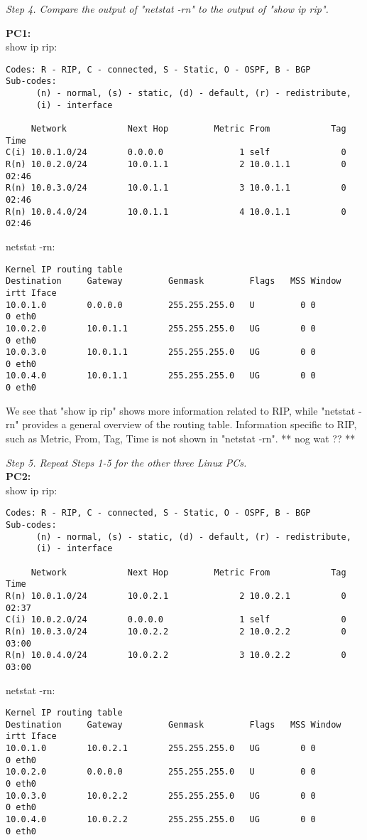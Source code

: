 \emph{Step 4. Compare the output of "netstat -rn" to the output of "show ip rip".}

\textbf{PC1:} \\
show ip rip:
\begin{lstlisting}
Codes: R - RIP, C - connected, S - Static, O - OSPF, B - BGP
Sub-codes:
      (n) - normal, (s) - static, (d) - default, (r) - redistribute,
      (i) - interface

     Network            Next Hop         Metric From            Tag Time
C(i) 10.0.1.0/24        0.0.0.0               1 self              0
R(n) 10.0.2.0/24        10.0.1.1              2 10.0.1.1          0 02:46
R(n) 10.0.3.0/24        10.0.1.1              3 10.0.1.1          0 02:46
R(n) 10.0.4.0/24        10.0.1.1              4 10.0.1.1          0 02:46
\end{lstlisting}
netstat -rn:
\begin{lstlisting}
Kernel IP routing table
Destination     Gateway         Genmask         Flags   MSS Window  irtt Iface
10.0.1.0        0.0.0.0         255.255.255.0   U         0 0          0 eth0
10.0.2.0        10.0.1.1        255.255.255.0   UG        0 0          0 eth0
10.0.3.0        10.0.1.1        255.255.255.0   UG        0 0          0 eth0
10.0.4.0        10.0.1.1        255.255.255.0   UG        0 0          0 eth0
\end{lstlisting}

We see that "show ip rip" shows more information related to RIP, while "netstat -rn" provides a general overview of the routing table.
Information specific to RIP, such as Metric, From, Tag, Time is not shown in "netstat -rn".  
** nog wat ?? **

\emph{Step 5. Repeat Steps 1-5 for the other three Linux PCs.} \\

\textbf{PC2:} \\
show ip rip:
\begin{lstlisting}
Codes: R - RIP, C - connected, S - Static, O - OSPF, B - BGP
Sub-codes:
      (n) - normal, (s) - static, (d) - default, (r) - redistribute,
      (i) - interface

     Network            Next Hop         Metric From            Tag Time
R(n) 10.0.1.0/24        10.0.2.1              2 10.0.2.1          0 02:37
C(i) 10.0.2.0/24        0.0.0.0               1 self              0
R(n) 10.0.3.0/24        10.0.2.2              2 10.0.2.2          0 03:00
R(n) 10.0.4.0/24        10.0.2.2              3 10.0.2.2          0 03:00
\end{lstlisting}
netstat -rn:
\begin{lstlisting}
Kernel IP routing table
Destination     Gateway         Genmask         Flags   MSS Window  irtt Iface
10.0.1.0        10.0.2.1        255.255.255.0   UG        0 0          0 eth0
10.0.2.0        0.0.0.0         255.255.255.0   U         0 0          0 eth0
10.0.3.0        10.0.2.2        255.255.255.0   UG        0 0          0 eth0
10.0.4.0        10.0.2.2        255.255.255.0   UG        0 0          0 eth0
\end{lstlisting}


